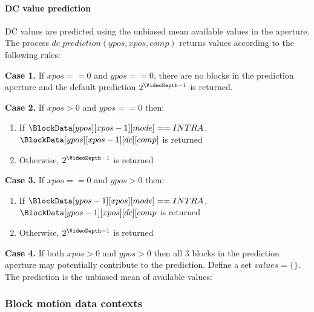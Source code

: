 \paragraph{DC value prediction \\}
\label{dcprediction}

DC values are predicted using the unbiased mean available values in the aperture. The
process $dc\_prediction(ypos, xpos, comp)$ returns values according to
the following rules:

{\bf Case 1.}  If $xpos==0$ and $ypos==0$, there are no blocks in the prediction aperture and
the default prediction $2^{\VideoDepth-1}$ is returned.

{\bf Case 2.} If $xpos>0$ and $ypos==0$ then:
\begin{enumerate}
   \item If $\BlockData[ypos][xpos-1][mode]==\Intra$, $\BlockData[ypos][xpos-1][dc][comp]$ is returned
   \item Otherwise, $2^{\VideoDepth-1}$ is returned
\end{enumerate}

{\bf Case 3.} If $xpos==0$ and $ypos>0$ then:
\begin{enumerate}
   \item If $\BlockData[ypos-1][xpos][mode]==\Intra$, $\BlockData[ypos-1][xpos][dc][comp$ is returned
   \item Otherwise, $2^{\VideoDepth-1}$ is returned
\end{enumerate}

{\bf Case 4.} If both $xpos>0$ and $ypos>0$ then all 3 blocks in the prediction aperture may potentially
contribute to the prediction. Define a set $values=\{\}$. The prediction is the 
unbiased mean of available values:

\begin{pseudo*}

\bsIF{\BlockData[ypos][xpos-1][mode]==\Intra}
\bsEND
\bsIF{\BlockData[ypos-1][xpos][mode]==\Intra}
\bsEND
\bsIF{\BlockData[ypos-1][xpos-1][mode]==\Intra}
\bsEND

\bsELSE
\bsEND
\end{pseudo*}


\subsubsection{Block motion data contexts}

